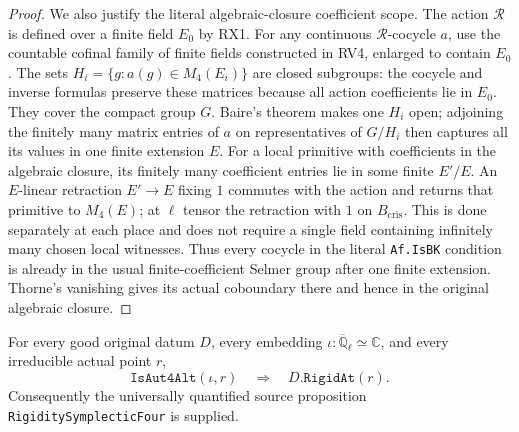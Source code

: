\begin{proof}
We also justify the literal algebraic-closure coefficient scope.
The action $\mathcal R$ is defined over a finite field $E_0$ by
RX1.  For any continuous $\mathcal R$-cocycle $a$, use the countable
cofinal family of finite fields constructed in RV4, enlarged to
contain $E_0$.  The sets
$H_i=\{g:a(g)\in M_4(E_i)\}$ are closed subgroups: the cocycle
and inverse formulas preserve these matrices because all action
coefficients lie in $E_0$.  They cover the compact group $G$.
Baire's theorem makes one $H_i$ open; adjoining the finitely many
matrix entries of $a$ on representatives of $G/H_i$ then captures
all its values in one finite extension $E$.
For a local primitive with coefficients in the algebraic closure,
its finitely many coefficient entries lie in some finite $E'/E$.
An $E$-linear retraction $E'\to E$ fixing $1$ commutes with the
action and returns that primitive to $M_4(E)$; at $\ell$ tensor
the retraction with $1$ on $B_{\mathrm{cris}}$.
This is done separately at each place and does not require a
single field containing infinitely many chosen local witnesses.
Thus every cocycle in the literal \texttt{Af.IsBK} condition is
already in the usual finite-coefficient Selmer group after one
finite extension.  Thorne's vanishing gives its actual coboundary
there and hence in the original algebraic closure.
\end{proof}

\begin{theorem}
\label{thm:rx-literal-rigidity}
For every good original datum $D$, every embedding
$\iota:\overline{\mathbb Q}_\ell\simeq\mathbb C$, and every
irreducible actual point $r$,
\[
          \texttt{IsAut4Alt}(\iota,r)
                       \quad\Longrightarrow\quad D.\texttt{RigidAt}(r).
 \tag{RX.26}
\]
Consequently the universally quantified source proposition
\texttt{RigiditySymplecticFour} is supplied.
\end{theorem}

